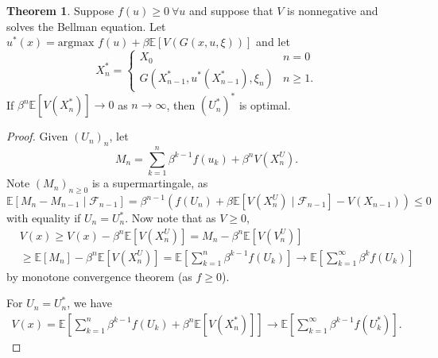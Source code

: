 \documentclass{article}
\theoremstyle{definition}
\newtheorem{theorem}{Theorem}[section]
\begin{document}
\begin{theorem}
    Suppose $f(u)\ge 0 ~\forall u$ and suppose that $V$ is nonnegative and solves the Bellman equation. Let $u^*(x) = \text{argmax }f(u) + \beta \mathbb{E}[V(G(x,u,\xi))]$ and let \[
    X_n^* = \begin{cases}
        X_0 &n=0\\
        G(X_{n-1}^*,u^*(X_{n-1}^*),\xi_n) &n\ge 1.
    \end{cases}
    \]
    If $\beta^n \mathbb{E}[V(X_n^*)] \to 0$ as $n \to \infty$, then $(U_n^*)^*$ is optimal.
\end{theorem}
\begin{proof}
    Given $(U_n)_n$, let \[
    M_n = \sum_{k=1}^{n} \beta^{k-1}f(u_k) + \beta^n V(X_n^U).
    \]
    Note $(M_n)_{n\ge 0}$ is a supermartingale, as \[
    \mathbb{E}[M_n-M_{n-1} \mid \mathcal{F}_{n-1}] = \beta^{n-1}\left(f(U_n)+\beta \mathbb{E}[V(X_n^U) \mid \mathcal{F}_{n-1}] - V(X_{n-1})\right)\le 0
    \] with equality if $U_n = U_n^*$. Now note that as $V\ge 0$,
    \begin{align*}
        &V(x)\ge V(x) - \beta^n \mathbb{E}[V(X_n^U)] = M_n - \beta^n \mathbb{E}[V(V_n^U)] \\
        &\ge \mathbb{E}[M_n] - \beta^n \mathbb{E}[V(X_n^U)] = \mathbb{E}[\sum_{k=1}^{n} \beta^{k-1}f(U_k)] \to \mathbb{E}[\sum_{k=1}^{\infty} \beta^k f(U_k)]
    \end{align*}
    by monotone convergence theorem (as $f\ge 0$).
    \vspace{1mm}
    
    For $U_n=U_n^*$, we have 
    \begin{align*}
        V(x)=\mathbb{E}[\sum_{k=1}^{n} \beta^{k-1}f(U_k)+\beta^n \mathbb{E}[V(X_n^*)]] \to \mathbb{E}[\sum_{k=1}^{\infty} \beta^{k-1}f(U_k^*)].
    \end{align*}

\end{proof}
\end{document}
